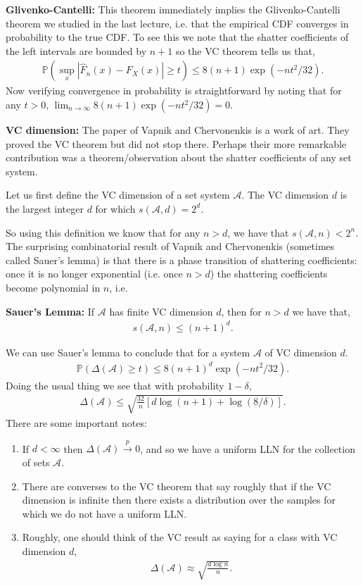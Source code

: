\documentclass[twoside,12pt]{article}
\newcommand{\cprob}{\overset{p}{\rightarrow}}
\begin{document}
{\bf Glivenko-Cantelli: } This theorem immediately implies the Glivenko-Cantelli theorem we studied in the last lecture, i.e. that the empirical CDF converges in probability to the true CDF. To see this we note that the shatter coefficients of the left intervals are bounded by $n+1$ so the VC theorem tells us that,
\begin{align*}
\mathbb{P}\left( \sup_{x} |\widehat{F}_n(x) - F_X(x)| \geq t\right) \leq 8 (n+1) \exp(-nt^2/32).
\end{align*}
Now verifying convergence in probability is straightforward by noting that 
for any $t > 0$, 
$\lim_{n \rightarrow \infty} 8 (n+1) \exp(-nt^2/32) = 0.$

{\bf VC dimension: } The paper of Vapnik and Chervonenkis is a work of art. They proved the VC theorem but did not stop there. Perhaps their more remarkable contribution was a theorem/observation about the shatter coefficients of any set system. 

Let us first define the VC dimension of a set system $\mathcal{A}$. The VC dimension $d$ is the largest integer $d$ for which $s(\mathcal{A},d) = 2^d$.

So using this definition we know that for any $n > d$, we have that $s(\mathcal{A},n) < 2^n$. The surprising combinatorial result of Vapnik and Chervonenkis (sometimes called Sauer's lemma) is that there is a phase transition of shattering coefficients: once it is no longer exponential (i.e. once $n > d$) the shattering coefficients become polynomial in $n$, i.e.

{\bf Sauer's Lemma: } If $\mathcal{A}$ has finite VC dimension $d$, then for $n > d$ we have that,
\begin{align*}
s(\mathcal{A},n) \leq (n+1)^d.
\end{align*}

We can use Sauer's lemma to conclude that for a system $\mathcal{A}$ of VC dimension $d$.
\begin{align*}
\mathbb{P}( \Delta(\mathcal{A}) \geq t) \leq 8 (n+1)^d \exp (- n t^2/32).
\end{align*}
Doing the usual thing we see that with probability $1 - \delta$, 
\begin{align*}
\Delta(\mathcal{A}) \leq \sqrt{ \frac{32}{n} \left[ d \log(n+1) + \log(8/\delta) \right]}.
\end{align*}
There are some important notes:
\begin{enumerate}
\item If $d < \infty$ then $\Delta(\mathcal{A}) \cprob 0$, and so we have a uniform LLN for the collection of sets $\mathcal{A}$. 
\item 
There are converses to the VC theorem that say roughly that if the VC dimension is infinite then there exists a distribution over the samples for which we do not have a uniform LLN.

\item Roughly, one should think of the VC result as saying for a class with VC dimension $d$, 
\begin{align*}
\Delta(\mathcal{A}) \approx \sqrt{ \frac{d \log n}{n}}.
\end{align*} 
\end{enumerate}
\end{document}
